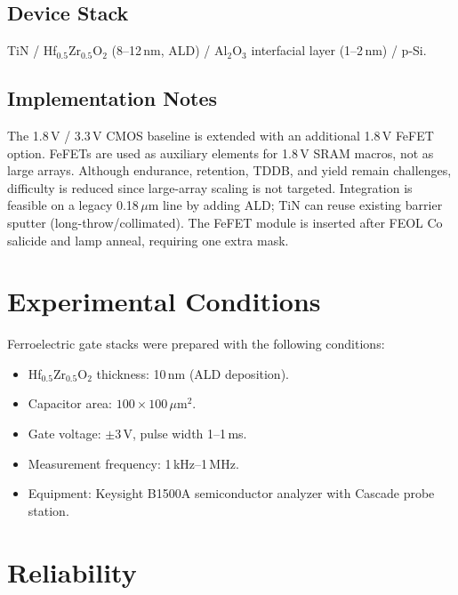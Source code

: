 \documentclass[journal]{IEEEtran}
\begin{document}
\subsection*{Device Stack}
TiN / Hf$_{0.5}$Zr$_{0.5}$O$_2$ (8--12\,nm, ALD) / Al$_2$O$_3$ interfacial layer (1--2\,nm) / p-Si.

\subsection*{Implementation Notes}
The 1.8\,V / 3.3\,V CMOS baseline is extended with an additional 1.8\,V FeFET option. FeFETs are used as auxiliary elements for 1.8\,V SRAM macros, not as large arrays. Although endurance, retention, TDDB, and yield remain challenges, difficulty is reduced since large-array scaling is not targeted. Integration is feasible on a legacy 0.18\,$\mu$m line by adding ALD; TiN can reuse existing barrier sputter (long-throw/collimated). The FeFET module is inserted after FEOL Co salicide and lamp anneal, requiring one extra mask.

\section{Experimental Conditions}
Ferroelectric gate stacks were prepared with the following conditions:
\begin{itemize}
  \item Hf$_{0.5}$Zr$_{0.5}$O$_2$ thickness: 10\,nm (ALD deposition).
  \item Capacitor area: $100\times100\,\mu\mathrm{m}^2$.
  \item Gate voltage: $\pm3$\,V, pulse width 1–1\,ms.
  \item Measurement frequency: 1\,kHz–1\,MHz.
  \item Equipment: Keysight B1500A semiconductor analyzer with Cascade probe station.
\end{itemize}

\section{Reliability}
\end{document}
